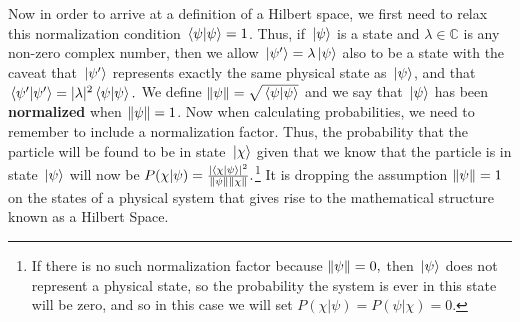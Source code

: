 Now in order to arrive at a definition of a Hilbert space, we first need to relax this normalization condition $\ip*{\psi}{\psi}=1$. Thus, if $\ket*{\psi}$  is a state and $\lambda\in\mathbb{C}$ is any non-zero complex number, then we allow $\ket*{\psi'}=\lambda\ket*{\psi}$ also to be a state with the caveat that $\ket*{\psi'}$ represents exactly the same physical state as $\ket*{\psi}$, and that $\ip*{\psi'}{\psi'}=|\lambda|^2\ip*{\psi}{\psi}.$ We define $\norm{\psi}=\sqrt{\ip*{\psi}{\psi}}$ %
%
and we say that $\ket*{\psi}$ has been \textbf{normalized} when $\norm{\psi}=1$. Now when calculating probabilities, we need to remember to include a normalization factor. Thus, the probability that the particle will be found to be in state $\ket*{\chi}$ given that we know that the particle is in state $\ket*{\psi}$ will now be $P(\chi|\psi) = \frac{|\ip*{\chi}{\psi}|^2}{\norm{\psi}\norm{\chi}}.$\footnote{ If there is no such normalization factor because $\norm{\psi}=0,$ then $\ket*{\psi}$ does not represent a physical state, so the probability the system is ever in this state will be zero, and so in this case we will set $P(\chi|\psi)=P(\psi|\chi)=0.$} It is  dropping the assumption $\norm{\psi}=1$ on the states of a physical system that gives rise to the mathematical structure known as a Hilbert Space.   

